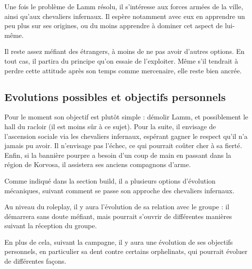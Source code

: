 \documentclass[10pt,a4paper]{book}
\begin{document}
Une fois le problème de Lamm résolu, il s'intéresse aux forces armées de la ville, ainsi qu'aux chevaliers infernaux. Il espère notamment avec eux en apprendre un peu plus sur ses origines, ou du moins apprendre à dominer cet aspect de lui-même.

Il reste assez méfiant des étrangers, à moins de ne pas avoir d'autres options. En tout cas, il partira du principe qu'on essaie de l'exploiter. Même s'il tendrait à perdre cette attitude après son temps comme mercenaire, elle reste bien ancrée.
\subsection{Evolutions possibles et objectifs personnels}
Pour le moment son objectif est plutôt simple : démolir Lamm, et possiblement le hall du racloir (il est moins sûr à ce sujet). Pour la suite, il envisage de l'ascension sociale via les chevaliers infernaux, espérant gagner le respect qu'il n'a jamais pu avoir. Il n'envisage pas l'échec, ce qui pourrait coûter cher à sa fierté. Enfin, si la bannière pourpre a besoin d'un coup de main en passant dans la région de Korvosa, il assistera ses anciens compagnons d'arme.

Comme indiqué dans la section build, il a plusieurs options d'évolution mécaniques, suivant comment se passe son approche des chevaliers infernaux.

Au niveau du roleplay, il y aura l'évolution de sa relation avec le groupe : il démarrera sans doute méfiant, mais pourrait s'ouvrir de différentes manières suivant la réception du groupe. 

En plus de cela, suivant la campagne, il y aura une évolution de ses objectifs personnels, en particulier sa dent contre certains orphelinats, qui pourrait évoluer de différentes façons.
\end{document}
